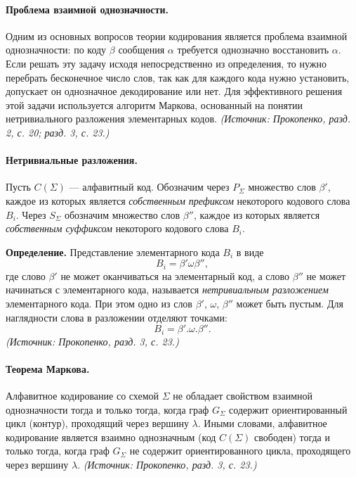 \documentclass[a4paper,12pt]{article}
\begin{document}
\paragraph{Проблема взаимной однозначности.}
Одним из основных вопросов теории кодирования является проблема взаимной однозначности: по коду \(\beta\) сообщения \(\alpha\) требуется однозначно восстановить \(\alpha\). Если решать эту задачу исходя непосредственно из определения, то нужно перебрать бесконечное число слов, так как для каждого кода нужно установить, допускает он однозначное декодирование или нет. Для эффективного решения этой задачи используется алгоритм Маркова, основанный на понятии нетривиального разложения элементарных кодов.
\textit{(Источник: Прокопенко, разд. 2, с. 20; разд. 3, с. 23.)}

\paragraph{Нетривиальные разложения.}
Пусть \(C(\Sigma)\) — алфавитный код. Обозначим через \(P_\Sigma\) множество слов \(\beta'\), каждое из которых является \emph{собственным префиксом} некоторого кодового слова \(B_i\). Через \(S_\Sigma\) обозначим множество слов \(\beta''\), каждое из которых является \emph{собственным суффиксом} некоторого кодового слова \(B_i\).

\textbf{Определение.} Представление элементарного кода \(B_i\) в виде
\[
B_i=\beta'\omega\beta'',
\]
где слово \(\beta'\) не может оканчиваться на элементарный код, а слово \(\beta''\) не может начинаться с элементарного кода, называется \emph{нетривиальным разложением} элементарного кода. При этом одно из слов \(\beta'\), \(\omega\), \(\beta''\) может быть пустым. Для наглядности слова в разложении отделяют точками:
\[
B_i=\beta'.\omega.\beta''.
\]
\textit{(Источник: Прокопенко, разд. 3, с. 23.)}

\paragraph{Теорема Маркова.}
Алфавитное кодирование со схемой \(\Sigma\) не обладает свойством взаимной однозначности тогда и только тогда, когда граф \(G_\Sigma\) содержит ориентированный цикл (контур), проходящий через вершину \(\lambda\). Иными словами, алфавитное кодирование является взаимно однозначным (код \(C(\Sigma)\) свободен) тогда и только тогда, когда граф \(G_\Sigma\) не содержит ориентированного цикла, проходящего через вершину \(\lambda\).
\textit{(Источник: Прокопенко, разд. 3, с. 23.)}
\end{document}
